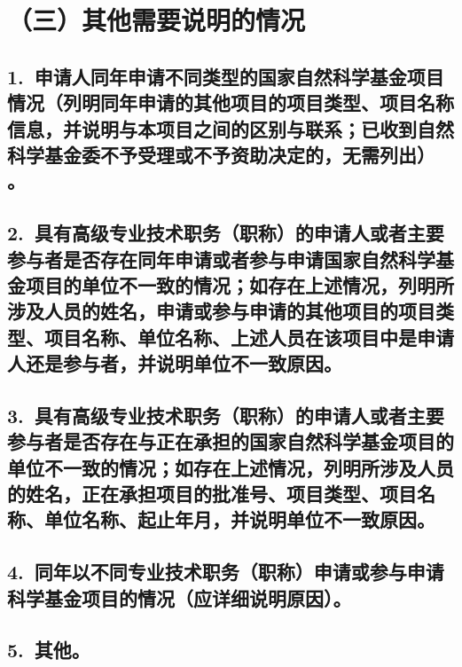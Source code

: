 \documentclass[12pt,UTF8,AutoFakeBold=2.5,a4paper]{ctexart} %
\begin{document}



\section{{\bfseries （三）其他需要说明的情况}} %

\subsection{\hspace{1.45em}  1.~申请人同年申请不同类型的国家自然科学基金项目情况（列明同年申请的其他项目的项目类型、项目名称信息，并说明与本项目之间的区别与联系；已收到自然科学基金委不予受理或不予资助决定的，无需列出）\hspace{-14pt} 。}




\subsection{\hspace{1.45em}  2.~具有高级专业技术职务（职称）的申请人或者主要参与者是否存在同年申请或者参与申请国家自然科学基金项目的单位不一致的情况；如存在上述情况，列明所涉及人员的姓名，申请或参与申请的其他项目的项目类型、项目名称、单位名称、上述人员在该项目中是申请人还是参与者，并说明单位不一致原因。}



\subsection{\hspace{1.45em}  3.~具有高级专业技术职务（职称）的申请人或者主要参与者是否存在与正在承担的国家自然科学基金项目的单位不一致的情况；如存在上述情况，列明所涉及人员的姓名，正在承担项目的批准号、项目类型、项目名称、单位名称、起止年月，并说明单位不一致原因。}




\subsection{\hspace{1.45em}  4.~同年以不同专业技术职务（职称）申请或参与申请科学基金项目的情况（应详细说明原因）。}




\subsection{\hspace{1.45em}  5.~其他。}



\clearpage
\end{document}
